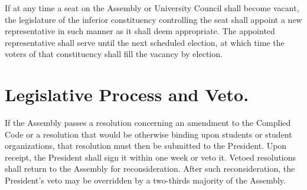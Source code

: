     If at any time a seat on the Assembly or University Council shall become vacant, the legislature of the inferior constituency controlling the seat shall appoint a new representative in such manner as it shall deem appropriate. The appointed representative shall serve until the next scheduled election, at which time the voters of that constituency shall fill the vacancy by election.


\section{Legislative Process and Veto.}
    If the Assembly passes a resolution concerning an amendment to the Complied Code or a resolution that would be otherwise binding upon students or student organizations, that resolution must then be submitted to the President. Upon receipt, the President shall sign it within one week or veto it. Vetoed resolutions shall return to the Assembly for reconsideration. After such reconsideration, the President's veto may be overridden by a  two-thirds majority of the Assembly.